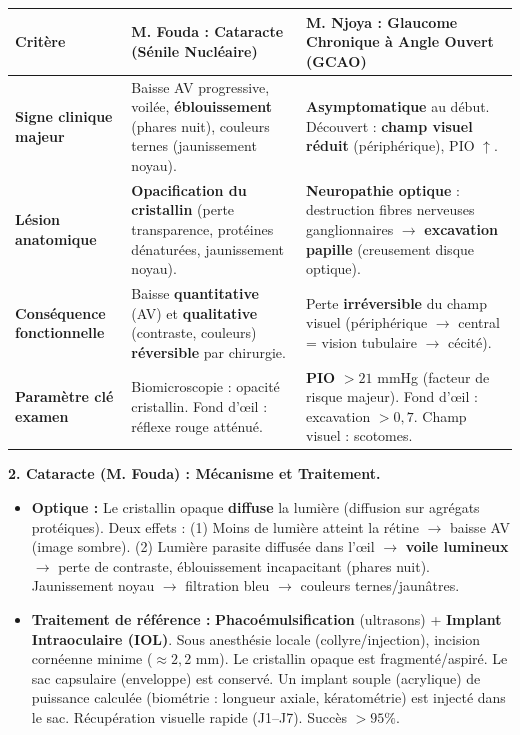 \documentclass[11pt]{article}
\begin{document}
\begin{exoresolu}
\begin{center}
\begin{tabularx}{\linewidth}{|l|X|X|}\hline
\rowcolor{popblueL} \textbf{Critère} & \textbf{M. Fouda : Cataracte (Sénile Nucléaire)} & \textbf{M. Njoya : Glaucome Chronique à Angle Ouvert (GCAO)} \\\hline
\textbf{Signe clinique majeur} & Baisse AV progressive, voilée, \textbf{éblouissement} (phares nuit), couleurs ternes (jaunissement noyau). & \textbf{Asymptomatique} au début. Découvert : \textbf{champ visuel réduit} (périphérique), PIO $\uparrow$. \\\hline
\textbf{Lésion anatomique} & \textbf{Opacification du cristallin} (perte transparence, protéines dénaturées, jaunissement noyau). & \textbf{Neuropathie optique} : destruction fibres nerveuses ganglionnaires $\rightarrow$ \textbf{excavation papille} (creusement disque optique). \\\hline
\textbf{Conséquence fonctionnelle} & Baisse \textbf{quantitative} (AV) et \textbf{qualitative} (contraste, couleurs) \textbf{réversible} par chirurgie. & Perte \textbf{irréversible} du champ visuel (périphérique $\rightarrow$ central = vision tubulaire $\rightarrow$ cécité). \\\hline
\textbf{Paramètre clé examen} & Biomicroscopie : opacité cristallin. Fond d'œil : réflexe rouge atténué. & \textbf{PIO} $> 21$ mmHg (facteur de risque majeur). Fond d'œil : excavation $> 0,7$. Champ visuel : scotomes. \\\hline
\end{tabularx}
\end{center}

\textbf{2. Cataracte (M. Fouda) : Mécanisme et Traitement.}
\begin{itemize}
    \item \textbf{Optique :} Le cristallin opaque \textbf{diffuse} la lumière (diffusion sur agrégats protéiques). Deux effets : (1) Moins de lumière atteint la rétine $\rightarrow$ baisse AV (image sombre). (2) Lumière parasite diffusée dans l'œil $\rightarrow$ \textbf{voile lumineux} $\rightarrow$ perte de contraste, éblouissement incapacitant (phares nuit). Jaunissement noyau $\rightarrow$ filtration bleu $\rightarrow$ couleurs ternes/jaunâtres.
    \item \textbf{Traitement de référence :} \textbf{Phacoémulsification} (ultrasons) + \textbf{Implant Intraoculaire (IOL)}. Sous anesthésie locale (collyre/injection), incision cornéenne minime ($\approx 2,2$ mm). Le cristallin opaque est fragmenté/aspiré. Le sac capsulaire (enveloppe) est conservé. Un implant souple (acrylique) de puissance calculée (biométrie : longueur axiale, kératométrie) est injecté dans le sac. Récupération visuelle rapide (J1--J7). Succès $> 95\%$.
\end{itemize}


\end{exoresolu}
\end{document}
